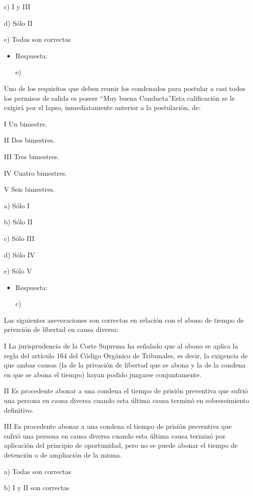 \documentclass[letterpaper, 11pt]{article}
\begin{document}
c) I y III

d) Sólo II

e) Todas son correctas

\begin{itemize}
\item Respuesta:

e)
\end{itemize}


Uno de los requisitos que deben reunir los condenados para postular a
casi todos los permisos de salida es poseer “Muy buena Conducta”Esta
calificación se le exigirá por el lapso, inmediatamente anterior a la
postulación, de:

I Un bimestre.

II Dos bimestres.

III Tres bimestres.

IV Cuatro bimestres.

V Seis bimestres.


a) Sólo I

b) Sólo II

c) Sólo III

d) Sólo IV

e) Sólo V

\begin{itemize}
\item Respuesta:

c)
\end{itemize}


Las siguientes aseveraciones son correctas en relación con el abono de
tiempo de privación de libertad en causa diversa:


I La jurisprudencia de la Corte Suprema ha señalado que al abono se
aplica la regla del artículo 164 del Código Orgánico de Tribunales, es
decir, la exigencia de que ambas causas (la de la privación de
libertad que se abona y la de la condena en que se abona el tiempo)
hayan podido juzgarse conjuntamente.


II Es procedente abonar a una condena el tiempo de prisión preventiva
que sufrió una persona en causa diversa cuando esta última causa
terminó en sobreseimiento definitivo.

III Es procedente abonar a una condena el tiempo de prisión preventiva
que sufrió una persona en causa diversa cuando esta última causa
terminó por aplicación del principio de oportunidad, pero no se puede
abonar el tiempo de detención o de ampliación de la misma.


a) Todas son correctas

b) I y II son correctas
\end{document}
